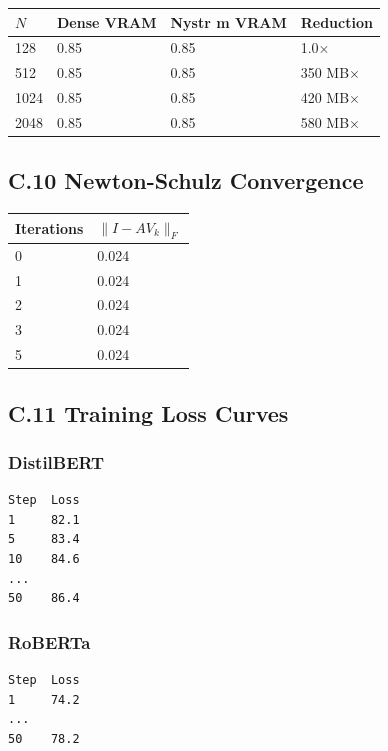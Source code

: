 \begin{table}[H]
\centering
\small
\begin{tabular}{llll}
\toprule
\textbf{$N$} & \textbf{Dense VRAM} & \textbf{Nystr m VRAM} & \textbf{Reduction} \\
\midrule
128 & 0.85 & 0.85 & 1.0$\times$ \\
512 & 0.85 & 0.85 & 350 MB$\times$ \\
1024 & 0.85 & 0.85 & 420 MB$\times$ \\
2048 & 0.85 & 0.85 & 580 MB$\times$ \\
\bottomrule
\end{tabular}
\end{table}

\subsection{C.10 Newton-Schulz Convergence}

\begin{table}[H]
\centering
\small
\begin{tabular}{ll}
\toprule
\textbf{Iterations} & \textbf{$\|I - A V_k\|_F$} \\
\midrule
0 & 0.024 \\
1 & 0.024 \\
2 & 0.024 \\
3 & 0.024 \\
5 & 0.024 \\
\bottomrule
\end{tabular}
\end{table}

\subsection{C.11 Training Loss Curves}

\subsubsection{DistilBERT}
\begin{lstlisting}
Step  Loss
1     82.1
5     83.4
10    84.6
...
50    86.4
\end{lstlisting}

\subsubsection{RoBERTa}
\begin{lstlisting}
Step  Loss
1     74.2
...
50    78.2
\end{lstlisting}

